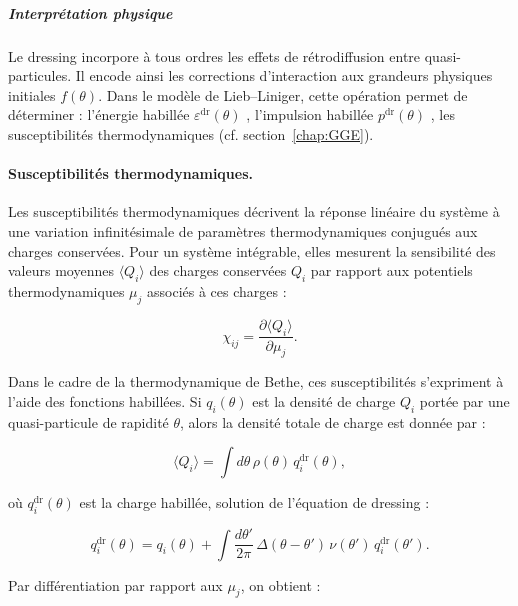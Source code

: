 
\subparagraph{Interprétation physique}

Le dressing incorpore à tous ordres les effets de rétrodiffusion entre quasi-particules. Il encode ainsi les corrections d’interaction aux grandeurs physiques initiales $f(\theta)$. Dans le modèle de Lieb–Liniger, cette opération permet de déterminer : l’énergie habillée $\varepsilon^{\mathrm{dr}}(\theta)$ , l’impulsion habillée $p^{\mathrm{dr}}(\theta)$ , les susceptibilités thermodynamiques (cf. section~\ref{chap:GGE}).

{\color{blue}
\paragraph{Susceptibilités thermodynamiques.}

Les susceptibilités thermodynamiques décrivent la réponse linéaire du système à une variation infinitésimale de paramètres thermodynamiques conjugués aux charges conservées. Pour un système intégrable, elles mesurent la sensibilité des valeurs moyennes $\langle Q_i \rangle$ des charges conservées $Q_i$ par rapport aux potentiels thermodynamiques $\mu_j$ associés à ces charges :

\begin{equation}
    \chi_{ij} = \frac{\partial \langle Q_i \rangle}{\partial \mu_j}.
\end{equation}

Dans le cadre de la thermodynamique de Bethe, ces susceptibilités s’expriment à l’aide des fonctions habillées. Si $q_i(\theta)$ est la densité de charge $Q_i$ portée par une quasi-particule de rapidité $\theta$, alors la densité totale de charge est donnée par :

\begin{equation}
    \langle Q_i \rangle = \int d\theta\, \rho(\theta)\, q_i^{\mathrm{dr}}(\theta),
\end{equation}

où $q_i^{\mathrm{dr}}(\theta)$ est la charge habillée, solution de l’équation de dressing :

\begin{equation}
    q_i^{\mathrm{dr}}(\theta) = q_i(\theta) + \int \frac{d\theta'}{2\pi}\, \Delta(\theta - \theta')\, \nu(\theta')\, q_i^{\mathrm{dr}}(\theta').
\end{equation}

Par différentiation par rapport aux $\mu_j$, on obtient :

}

